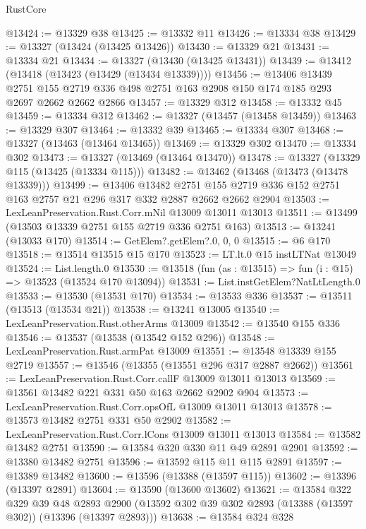 \begin{lexlean}{RustCore}
\begin{coremodule}
@13424 := @13329 @38
@13425 := @13332 @11
@13426 := @13334 @38
@13429 := @13327 (@13424 (@13425 @13426))
@13430 := @13329 @21
@13431 := @13334 @21
@13434 := @13327 (@13430 (@13425 @13431))
@13439 := @13412 (@13418 (@13423 (@13429 (@13434 @13339))))
@13456 := @13406
    @13439
    @2751
    @155
    @2719
    @336
    @498
    @2751
    @163
    @2908
    @150
    @174
    @185
    @293
    @2697
    @2662
    @2662
    @2866
@13457 := @13329 @312
@13458 := @13332 @45
@13459 := @13334 @312
@13462 := @13327 (@13457 (@13458 @13459))
@13463 := @13329 @307
@13464 := @13332 @39
@13465 := @13334 @307
@13468 := @13327 (@13463 (@13464 @13465))
@13469 := @13329 @302
@13470 := @13334 @302
@13473 := @13327 (@13469 (@13464 @13470))
@13478 := @13327 (@13329 @115 (@13425 (@13334 @115)))
@13482 := @13462 (@13468 (@13473 (@13478 @13339)))
@13499 := @13406
    @13482
    @2751
    @155
    @2719
    @336
    @152
    @2751
    @163
    @2757
    @21
    @296
    @317
    @332
    @2887
    @2662
    @2662
    @2904
@13503 := LexLeanPreservation.Rust.Corr.mNil @13009 @13011 @13013
@13511 := @13499 (@13503 @13339 @2751 @155 @2719 @336 @2751 @163)
@13513 := @13241 (@13033 @170)
@13514 := GetElem?.getElem?.{0, 0, 0}
@13515 := @6 @170
@13518 := @13514 @13515 @15 @170
@13523 := LT.lt.{0} @15 instLTNat @13049
@13524 := List.length.{0}
@13530 := @13518 (fun (as : @13515) => fun (i : @15) => @13523 (@13524 @170 @13094))
@13531 := List.instGetElem?NatLtLength.{0}
@13533 := @13530 (@13531 @170)
@13534 := @13533 @336
@13537 := @13511 (@13513 (@13534 @21))
@13538 := @13241 @13005
@13540 := LexLeanPreservation.Rust.otherArms @13009
@13542 := @13540 @155 @336
@13546 := @13537 (@13538 (@13542 @152 @296))
@13548 := LexLeanPreservation.Rust.armPat @13009
@13551 := @13548 @13339 @155 @2719
@13557 := @13546 (@13355 (@13551 @296 @317 @2887 @2662))
@13561 := LexLeanPreservation.Rust.Corr.callF @13009 @13011 @13013
@13569 := @13561 @13482 @221 @331 @50 @163 @2662 @2902 @904
@13573 := LexLeanPreservation.Rust.Corr.opsOfL @13009 @13011 @13013
@13578 := @13573 @13482 @2751 @331 @50 @2902
@13582 := LexLeanPreservation.Rust.Corr.lCons @13009 @13011 @13013
@13584 := @13582 @13482 @2751
@13590 := @13584 @320 @330 @11 @49 @2891 @2901
@13592 := @13380 @13482 @2751
@13596 := @13592 @115 @11 @115 @2891
@13597 := @13389 @13482
@13600 := @13596 (@13388 (@13597 @115))
@13602 := @13396 (@13397 @2891)
@13604 := @13590 (@13600 @13602)
@13621 := @13584
    @322
    @329
    @39
    @48
    @2893
    @2900
    (@13592 @302 @39 @302 @2893 (@13388 (@13597 @302)) (@13396 (@13397 @2893)))
@13638 := @13584
    @324
    @328

\end{coremodule}
\end{lexlean}
